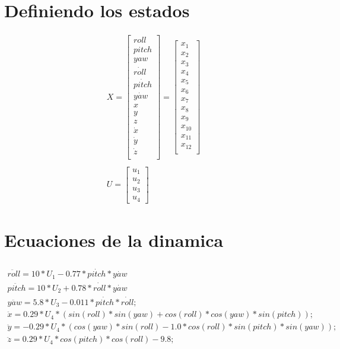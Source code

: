 \documentclass[varwidth,margin=3mm]{standalone}
\begin{document}
\section{Definiendo los estados}
\begin{gather*}
	X = \left [ \begin{matrix}
		roll\\
		pitch\\
		yaw\\
		\dot{roll}\\
		\dot{pitch}\\
		\dot{yaw}\\
		x\\
		y\\
		z\\
		\dot{x}\\
		\dot{y}\\
		\dot{z}\\
	\end{matrix}
	\right ] = 
	\left [ \begin{matrix}
		x_1\\
		x_2\\
		x_3\\
		x_4\\
		x_5\\
		x_6\\
		x_7\\
		x_8\\
		x_9\\
		x_{10}\\
		x_{11}\\
		x_{12}\\
	\end{matrix}
	\right ]
	\\
	\\
	U = \left [ \begin{matrix}
		u_1\\
		u_2\\
		u_3\\
		u_4
	\end{matrix}
	\right ]
\end{gather*}



\section{Ecuaciones de la dinamica}
\begin{gather*}
	\\
	\ddot{roll} = 10*U_1 - 0.77*\dot{pitch}*\dot{yaw} \\
	\ddot{pitch} = 10*U_2 + 0.78*\dot{roll}*\dot{yaw} \\
	\ddot{yaw} = 5.8*U_3 - 0.011*\dot{pitch}*\dot{roll};\\
	\ddot{x} = 0.29*U_4*(sin(roll)*sin(yaw) + cos(roll)*cos(yaw)*sin(pitch));\\
	\ddot{y}= -0.29*U_4*(cos(yaw)*sin(roll) - 1.0*cos(roll)*sin(pitch)*sin(yaw));\\
	\ddot{z} = 0.29*U_4*cos(pitch)*cos(roll) - 9.8;\\
	\\
\end{gather*}
\end{document}
